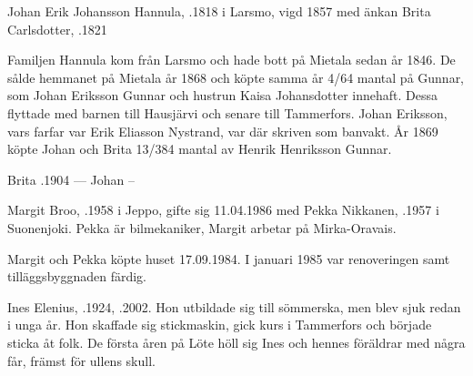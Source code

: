 Johan Erik Johansson Hannula, .1818 i Larsmo, vigd 1857 med änkan Brita Carlsdotter, .1821
\begin{jhchildren}
  \item {}
  \item {}
  \item {}
  \item {}
  \item {}
\end{jhchildren}

Familjen Hannula kom från Larsmo och hade bott på Mietala sedan år 1846. De sålde hemmanet på Mietala år 1868 och köpte samma år 4/64 mantal på Gunnar, som Johan Eriksson Gunnar och hustrun Kaisa Johansdotter innehaft. Dessa flyttade med barnen till Hausjärvi och senare till Tammerfors. Johan Eriksson, vars farfar var Erik Eliasson Nystrand, var där skriven som banvakt. År 1869 köpte Johan och Brita 13/384 mantal av Henrik Henriksson Gunnar.

Brita .1904  ---  Johan --






Margit Broo, .1958 i Jeppo, gifte sig 11.04.1986 med Pekka Nikkanen, .1957 i Suonenjoki. Pekka är bilmekaniker, Margit arbetar på Mirka-Oravais.
\begin{jhchildren}
  \item {}
  \item {}
\end{jhchildren}

Margit och Pekka köpte huset 17.09.1984. I januari 1985 var renoveringen samt tilläggsbyggnaden färdig.


Ines Elenius, .1924, .2002. Hon utbildade sig till sömmerska, men blev sjuk redan i unga år. Hon skaffade sig stickmaskin, gick kurs i Tammerfors och började sticka åt folk. De första åren på Löte höll sig Ines och hennes föräldrar med några får, främst för ullens skull.

